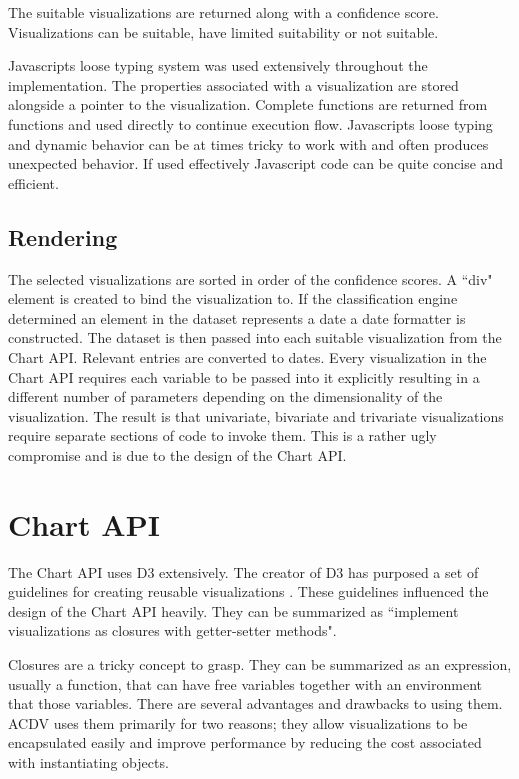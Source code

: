 \documentclass[a4paper, 11pt, titlepage, onehalfspacing]{report}
\begin{document}
The suitable visualizations are returned along with a confidence score. Visualizations can be suitable, have limited suitability or not suitable.

Javascripts loose typing system was used extensively throughout the implementation. The properties associated with a visualization are stored alongside a pointer to the visualization. Complete functions are returned from functions and used directly to continue execution flow. Javascripts loose typing and dynamic behavior can be at times tricky to work with and often produces unexpected behavior. If used effectively Javascript code can be quite concise and efficient.  


\subsection{Rendering}
The selected visualizations are sorted in order of the confidence scores. A ``div" element is created to bind the visualization to. If the classification engine determined an element in the dataset represents a date a date formatter is constructed. The dataset is then passed into each suitable visualization from the Chart API. Relevant entries are converted to dates. Every visualization in the Chart API requires each variable to be passed into it explicitly resulting in a different number of parameters depending on the dimensionality of the visualization. The result is that univariate, bivariate and trivariate visualizations require separate sections of code to invoke them. This is a rather ugly compromise and is due to the design of the Chart API.

\section{Chart API}
The Chart API uses D3 extensively. The creator of D3 has purposed a set of guidelines for creating reusable visualizations \cite{mikeconvention}. These guidelines influenced the design of the Chart API heavily. They can be summarized as ``implement visualizations as closures with getter-setter methods".

Closures are a tricky concept to grasp. They can be summarized as an expression, usually a function, that can have free variables together with an environment that those variables. There are several advantages and drawbacks to using them. AC\lightning{}DV uses them primarily for two reasons; they allow visualizations to be encapsulated easily and improve performance by reducing the cost associated with instantiating objects.
\end{document}
